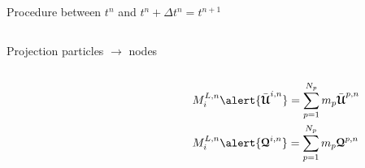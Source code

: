 \begin{frame}{Procedure between $t^n$ and $t^n + \Delta t^n=t^{n+1}$}
\begin{footnotesize}
\begin{columns}
\begin{column}{0.6\textwidth}
\begin{block}{Projection particles $\rightarrow$ nodes}
\begin{columns}
\begin{column}{0.3\textwidth}
            \end{column}
            \begin{column}{0.6\textwidth}
              \begin{equation*}
                \begin{aligned}
                  & M^{L,n}_i \alert{\bar{\Ucb}^{i,n}} = \sum_{p=1}^{N_p} m_p \bar{\Ucb}^{p,n}\\
                  & M^{L,n}_i \alert{\Qcb^{i,n}} = \sum_{p=1}^{N_p} m_p \Qcb^{p,n}
                \end{aligned}
              \end{equation*}
            \end{column}
          \end{columns}
        \end{block}
      \end{column}
    \end{columns}
  \end{footnotesize}
\end{frame}


